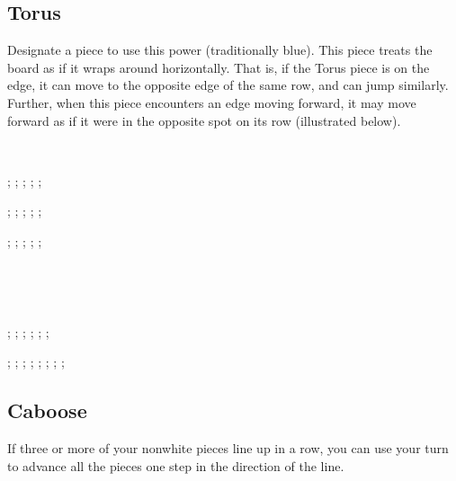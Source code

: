 \documentclass{article}
\begin{document}
\subsection*{Torus}
Designate a piece to use this power (traditionally blue).
This piece treats the board as if it wraps around horizontally.
That is, if the Torus piece is on the edge, it can move to the opposite edge of the same row, and can jump similarly.
Further, when this piece encounters an edge moving forward, it may move forward as if it were in the opposite spot on its row (illustrated below).

\

\begin{center}
\begin{struggleboard}
  ;
  ;
  ;
  ;
  ;
\end{struggleboard}
\begin{struggleboard}
  ;
  ;
  ;
  ;
  ;
\end{struggleboard}
\begin{struggleboard}
  ;
  ;
  ;
  ;
  ;
\end{struggleboard}

\

\

\begin{struggleboard}{0.5}
  ;
  ;
  ;
  ;
  ;
  ;
\end{struggleboard}
\quad
\begin{struggleboard}
  ;
  ;
  ;
  ;
  ;
  ;
  ;
  ;
\end{struggleboard}
\end{center}

\newpage

\subsection*{Caboose}

If three or more of your nonwhite pieces line up in a row,
you can use your turn to advance all the pieces one step in the direction of the line.
\end{document}
